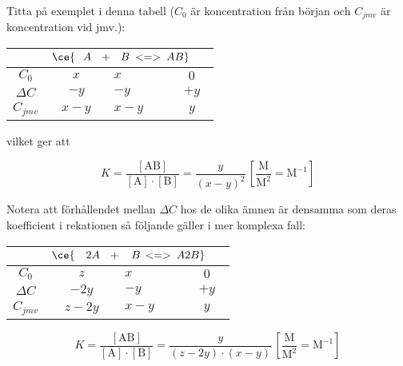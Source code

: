 \begin{exm}
    Titta på exemplet i denna tabell ($C_0$ är koncentration från början och $C_{jmv}$ är koncentration vid jmv.):
    
    \begin{table}[H]
        \centering
        \begin{tabular}{|c|c|>{\centering\arraybackslash}m{31.5pt}|c|} 
        \cline{2-4}
        \multicolumn{1}{l|}{} & \multicolumn{3}{c|}{$\ce{\hspace{7pt} A \hspace{7pt} + \hspace{7pt} B \hspace{2pt} <=> \hspace{2pt} AB} \hspace{15pt}$}  \\ 
        \hline
        $C_0$                 & $x$   & $x$   & $0$                       \\ 
        \hline
        $\Delta C$            & $-y$  & $-y$  & $+y$                      \\ 
        \hline
        $C_{jmv}$             & $x-y$ & $x-y$ & $y$                       \\
        \hline
        \end{tabular}
    \end{table}
    
    \noindent vilket ger att
    
    \begin{equation*}
        K = \frac{[\mathrm{AB}]}{\mathrm{[A] \cdot [B]}} = \frac{y}{(x-y)^2} \, \mathrm{\left[\frac{M}{M^2}=M^{-1}\right]}
    \end{equation*}
    
    Notera att förhållendet mellan $\Delta C$ hos de olika ämnen är densamma som deras koefficient i rekationen så följande gäller i mer komplexa fall:
    
    \begin{table}[H]
        \centering
        \begin{tabular}{|c|c|>{\centering\arraybackslash}m{31.5pt}|c|} 
        \cline{2-4}
        \multicolumn{1}{l|}{} & \multicolumn{3}{c|}{$\ce{\hspace{10pt} 2A \hspace{7pt} + \hspace{9pt} B \hspace{1.5pt} <=> \hspace{2pt} A2B} \hspace{15pt}$}  \\ 
        \hline
        $C_0$                 & $z$   & $x$   & $0$                       \\ 
        \hline
        $\Delta C$            & $-2y$  & $-y$  & $+y$                      \\ 
        \hline
        $C_{jmv}$             & $z-2y$ & $x-y$ & $y$                       \\
        \hline
        \end{tabular}
    \end{table}
    
    \begin{equation*}
        K = \frac{[\mathrm{AB}]}{\mathrm{[A] \cdot [B]}} = \frac{y}{(z-2y) \cdot (x-y)} \, \mathrm{\left[\frac{M}{M^2}=M^{-1}\right]}
    \end{equation*}
\end{exm}